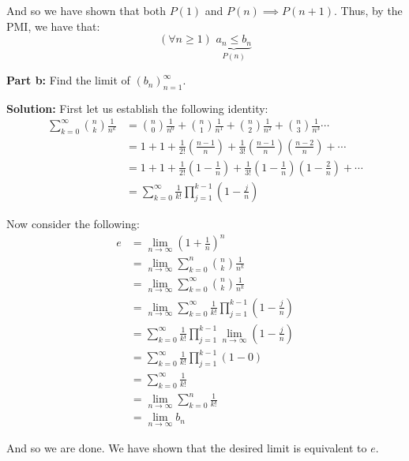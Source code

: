\documentclass{article}
\begin{document}
And so we have shown that both $P(1)$ and $P(n)\implies P(n+1)$. Thus, by the PMI, we have that:
\begin{equation*}
  (\forall n\ge1)\,\,\underbrace{a_n\le b_n}_{P(n)}
\end{equation*}
\bigskip

\noindent\textbf{Part b:} Find the limit of $(b_n)_{n=1}^\infty$.
\bigskip

\noindent\textbf{Solution:}  First let us establish the following identity:
\begin{align*}
  \sum^\infty_{k=0}\binom{n}{k}\frac{1}{n^k}&=\binom{n}{0}\frac{1}{n^0}+\binom{n}{1}\frac{1}{n^1}+\binom{n}{2}\frac{1}{n^2}+\binom{n}{3}\frac{1}{n^3}\cdots\\
  &=1+1+\frac{1}{2!}\left(\frac{n-1}{n}\right)+\frac{1}{3!}\left(\frac{n-1}{n}\right)\left(\frac{n-2}{n}\right)+\cdots\\
  &=1+1+\frac{1}{2!}\left(1-\frac{1}{n}\right)+\frac{1}{3!}\left(1-\frac{1}{n}\right)\left(1-\frac{2}{n}\right)+\cdots\\
  &=\sum^\infty_{k=0}\frac{1}{k!}\prod^{k-1}_{j=1}\left(1-\frac{j}{n}\right)
\end{align*}

Now consider the following:
\begin{align*}
  e&=\lim_{n\to\infty}\left(1+\frac{1}{n}\right)^n\tag{def. of $e$}\\
  &=\lim_{n\to\infty}\sum^n_{k=0}\binom{n}{k}\frac{1}{n^k}\tag{binomial theorem}\\
  &=\lim_{n\to\infty}\sum^\infty_{k=0}\binom{n}{k}\frac{1}{n^k}\\
  &=\lim_{n\to\infty}\sum^\infty_{k=0}\frac{1}{k!}\prod^{k-1}_{j=1}\left(1-\frac{j}{n}\right)\tag{identity from above}\\
  &=\sum^\infty_{k=0}\frac{1}{k!}\prod^{k-1}_{j=1}\lim_{n\to\infty}\left(1-\frac{j}{n}\right)\tag{limit of sum/product is sum/product of limit}\\
  &=\sum^\infty_{k=0}\frac{1}{k!}\prod^{k-1}_{j=1}\left(1-0\right)\\
  &=\sum^\infty_{k=0}\frac{1}{k!}\\
  &=\lim_{n\to\infty}\sum^n_{k=0}\frac{1}{k!}\tag{def. of infinite series}\\
  &=\lim_{n\to\infty}b_n\tag{def. of $b_n$}
\end{align*}

And so we are done. We have shown that the desired limit is equivalent to $e$.
\end{document}
